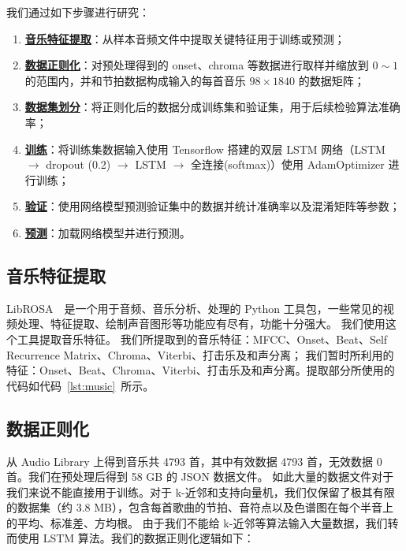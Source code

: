 \documentclass[a4paper,utf8,10pt]{article}
\newcommand{\sept}{\setlength\itemsep{-4pt}}
\begin{document}
我们通过如下步骤进行研究：
\begin{enumerate}
  \sept
  \item \textbf{\hyperref[sec:music]{音乐特征提取}}：从样本音频文件中提取关键特征用于训练或预测；
  \item \textbf{\hyperref[sec:normalize]{数据正则化}}：对预处理得到的 onset、chroma 等数据进行取样并缩放到 $0 \sim 1$ 的范围内，并和节拍数据构成输入的每首音乐 $98 \times 1840$ 的数据矩阵；
  \item \textbf{\hyperref[sec:split]{数据集划分}}：将正则化后的数据分成训练集和验证集，用于后续检验算法准确率；
  \item \textbf{\hyperref[sec:train]{训练}}：将训练集数据输入使用 Tensorflow 搭建的双层 LSTM 网络（LSTM $\rightarrow$ dropout (0.2) $\rightarrow$ LSTM $\rightarrow$ 全连接(softmax)）使用 AdamOptimizer 进行训练；
  \item \textbf{\hyperref[sec:validation]{验证}}：使用网络模型预测验证集中的数据并统计准确率以及混淆矩阵等参数；
  \item \textbf{\hyperref[sec:predict]{预测}}：加载网络模型并进行预测。
\end{enumerate}

\subsection{音乐特征提取}\label{sec:music}
LibROSA~\cite{librosa18}~是一个用于音频、音乐分析、处理的 Python 工具包，一些常见的视频处理、特征提取、绘制声音图形等功能应有尽有，功能十分强大。
我们使用这个工具提取音乐特征。
我们所提取到的音乐特征：MFCC、Onset、Beat、Self Recurrence Matrix、Chroma、Viterbi、打击乐及和声分离；
我们暂时所利用的特征：Onset、Beat、Chroma、Viterbi、打击乐及和声分离。提取部分所使用的代码如代码~\ref{lst:music}~所示。

\subsection{数据正则化}\label{sec:normalize}

\indent 从 Audio Library 上得到音乐共 4793 首，其中有效数据 4793 首，无效数据 0 首。我们在预处理后得到 58 GB 的 JSON 数据文件。
如此大量的数据文件对于我们来说不能直接用于训练。对于 k-近邻和支持向量机，我们仅保留了极其有限的数据集（约 3.8 MB），包含每首歌曲的节拍、音符点以及色谱图在每个半音上的平均、标准差、方均根。
由于我们不能给 k-近邻等算法输入大量数据，我们转而使用 LSTM 算法。我们的数据正则化逻辑如下：
\end{document}
